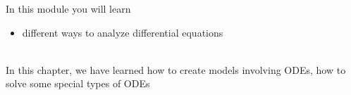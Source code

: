 In this module you will learn
\begin{itemize}
	\item different ways to analyze differential equations
\end{itemize}

\hfill \\



In this chapter, we have learned how to create models involving ODEs, how to solve some special types of ODEs

